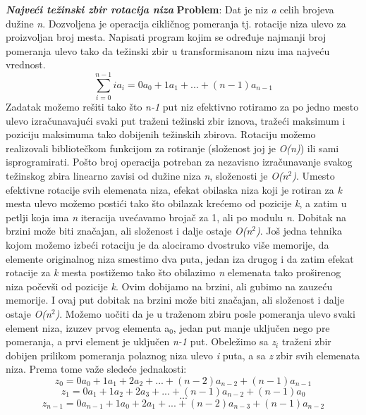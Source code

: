 \documentclass{article}
\begin{document}
\vspace{0.2cm}\newline \textbf{\textit{Najveći težinski zbir rotacija niza}}
\newline \textbf{Problem}: Dat je niz \textit{a} celih brojeva dužine \textit{n}. Dozvoljena je operacija cikličnog
pomeranja tj. rotacije niza ulevo za proizvoljan broj mesta. Napisati program
kojim se određuje najmanji broj pomeranja ulevo tako da težinski zbir u transformisanom nizu ima najveću vrednost.
$$ \sum_{i=0}^{n-1} ia_i = 0a_0 + 1a_1 + ... + (n-1)a_{n-1} $$
Zadatak možemo rešiti tako što \textit{n-1} put niz efektivno rotiramo za po jedno
mesto ulevo izračunavajući svaki put traženi težinski zbir iznova, tražeći maksimum i poziciju maksimuma tako dobijenih težinskih zbirova. Rotaciju možemo
realizovali bibliotečkom funkcijom za rotiranje (složenost joj je \textit{O(n)}) ili sami isprogramirati. Pošto broj operacija potreban za nezavisno izračunavanje svakog težinskog zbira linearno zavisi od dužine niza \textit{n}, složenosti je \textit{O(n$^2$)}.
\newline Umesto efektivne rotacije svih elemenata niza, efekat obilaska niza koji je rotiran za \textit{k} mesta
ulevo možemo postići tako što obilazak krećemo od pozicije \textit{k}, a zatim u petlji
koja ima \textit{n} iteracija uvećavamo brojač za 1, ali po modulu \textit{n}. Dobitak na brzini može biti značajan, ali složenost i dalje ostaje \textit{O(n$^2$)}.
\newline Još jedna tehnika kojom možemo izbeći rotaciju je da alociramo dvostruko više
memorije, da elemente originalnog niza smestimo dva puta, jedan iza drugog i
da zatim efekat rotacije za \textit{k} mesta postižemo tako što obilazimo \textit{n} elemenata
tako proširenog niza počevši od pozicije \textit{k}. Ovim dobijamo na brzini, ali gubimo
na zauzeću memorije. I ovaj put dobitak na brzini može biti značajan, ali
složenost i dalje ostaje \textit{O(n$^2$)}.
\newline Možemo uočiti da je u traženom zbiru posle pomeranja ulevo svaki element niza,
izuzev prvog elementa a$_0$, jedan put manje uključen nego pre pomeranja, a prvi
element je uključen \textit{n-1} put. Obeležimo sa \textit{z$_i$} traženi zbir dobijen prilikom
pomeranja polaznog niza ulevo \textit{i} puta, a sa \textit{z} zbir svih elemenata niza. Prema
tome važe sledeće jednakosti:
$$z_0 = 0a_0 + 1a_1 + 2a_2 + ... + (n - 2)a_{n-2} + (n - 1)a_{n-1}$$
$$z_1 = 0a_1 + 1a_2 + 2a_3 + ... + (n - 1)a_{n-2} + (n - 1)a_0$$
$$ ... $$
$$z_{n-1} = 0a_{n-1} + 1a_0 + 2a_1 + ... + (n - 2)a_{n-3} + (n - 1)a_{n-2}$$
\end{document}
